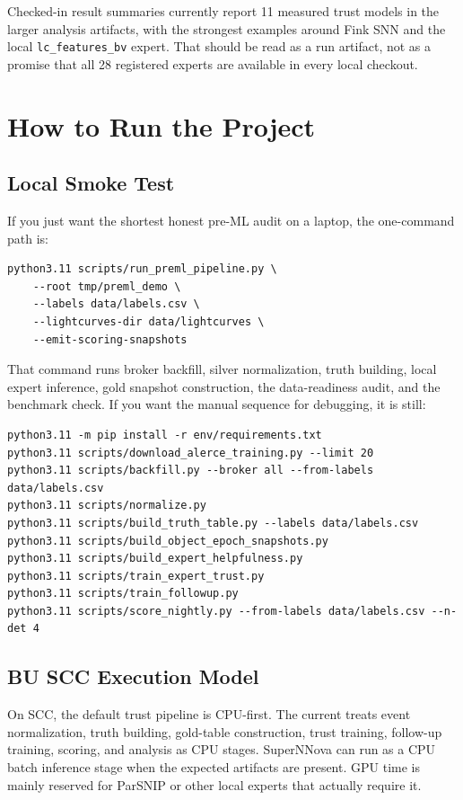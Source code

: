 \documentclass[11pt]{article}
\newcommand{\code}[1]{\texttt{#1}}
\newcommand{\filepath}[1]{\path{#1}}
\begin{document}
Checked-in result summaries currently report 11 measured trust models in the larger analysis artifacts, with the strongest examples around Fink SNN and the local \code{lc\_features\_bv} expert. That should be read as a run artifact, not as a promise that all 28 registered experts are available in every local checkout.

\section{How to Run the Project}

\subsection{Local Smoke Test}

If you just want the shortest honest pre-ML audit on a laptop, the one-command path is:

\begin{verbatim}
python3.11 scripts/run_preml_pipeline.py \
    --root tmp/preml_demo \
    --labels data/labels.csv \
    --lightcurves-dir data/lightcurves \
    --emit-scoring-snapshots
\end{verbatim}

That command runs broker backfill, silver normalization, truth building, local expert inference, gold snapshot construction, the data-readiness audit, and the benchmark check. If you want the manual sequence for debugging, it is still:

\begin{verbatim}
python3.11 -m pip install -r env/requirements.txt
python3.11 scripts/download_alerce_training.py --limit 20
python3.11 scripts/backfill.py --broker all --from-labels data/labels.csv
python3.11 scripts/normalize.py
python3.11 scripts/build_truth_table.py --labels data/labels.csv
python3.11 scripts/build_object_epoch_snapshots.py
python3.11 scripts/build_expert_helpfulness.py
python3.11 scripts/train_expert_trust.py
python3.11 scripts/train_followup.py
python3.11 scripts/score_nightly.py --from-labels data/labels.csv --n-det 4
\end{verbatim}

\subsection{BU SCC Execution Model}

On SCC, the default trust pipeline is CPU-first. The current \filepath{README_scc.md} treats event normalization, truth building, gold-table construction, trust training, follow-up training, scoring, and analysis as CPU stages. SuperNNova can run as a CPU batch inference stage when the expected artifacts are present. GPU time is mainly reserved for ParSNIP or other local experts that actually require it.
\end{document}
